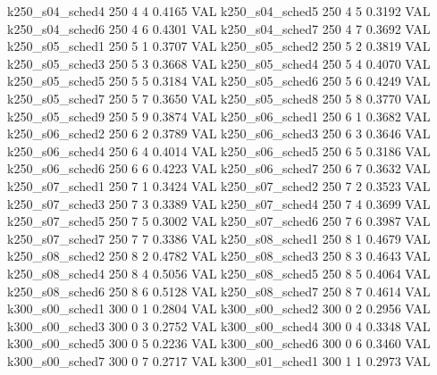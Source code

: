   k250_s04_sched4                  250    4   4    0.4165  VAL
  k250_s04_sched5                  250    4   5    0.3192  VAL
  k250_s04_sched6                  250    4   6    0.4301  VAL
  k250_s04_sched7                  250    4   7    0.3692  VAL
  k250_s05_sched1                  250    5   1    0.3707  VAL
  k250_s05_sched2                  250    5   2    0.3819  VAL
  k250_s05_sched3                  250    5   3    0.3668  VAL
  k250_s05_sched4                  250    5   4    0.4070  VAL
  k250_s05_sched5                  250    5   5    0.3184  VAL
  k250_s05_sched6                  250    5   6    0.4249  VAL
  k250_s05_sched7                  250    5   7    0.3650  VAL
  k250_s05_sched8                  250    5   8    0.3770  VAL
  k250_s05_sched9                  250    5   9    0.3874  VAL
  k250_s06_sched1                  250    6   1    0.3682  VAL
  k250_s06_sched2                  250    6   2    0.3789  VAL
  k250_s06_sched3                  250    6   3    0.3646  VAL
  k250_s06_sched4                  250    6   4    0.4014  VAL
  k250_s06_sched5                  250    6   5    0.3186  VAL
  k250_s06_sched6                  250    6   6    0.4223  VAL
  k250_s06_sched7                  250    6   7    0.3632  VAL
  k250_s07_sched1                  250    7   1    0.3424  VAL
  k250_s07_sched2                  250    7   2    0.3523  VAL
  k250_s07_sched3                  250    7   3    0.3389  VAL
  k250_s07_sched4                  250    7   4    0.3699  VAL
  k250_s07_sched5                  250    7   5    0.3002  VAL
  k250_s07_sched6                  250    7   6    0.3987  VAL
  k250_s07_sched7                  250    7   7    0.3386  VAL
  k250_s08_sched1                  250    8   1    0.4679  VAL
  k250_s08_sched2                  250    8   2    0.4782  VAL
  k250_s08_sched3                  250    8   3    0.4643  VAL
  k250_s08_sched4                  250    8   4    0.5056  VAL
  k250_s08_sched5                  250    8   5    0.4064  VAL
  k250_s08_sched6                  250    8   6    0.5128  VAL
  k250_s08_sched7                  250    8   7    0.4614  VAL
  k300_s00_sched1                  300    0   1    0.2804  VAL
  k300_s00_sched2                  300    0   2    0.2956  VAL
  k300_s00_sched3                  300    0   3    0.2752  VAL
  k300_s00_sched4                  300    0   4    0.3348  VAL
  k300_s00_sched5                  300    0   5    0.2236  VAL
  k300_s00_sched6                  300    0   6    0.3460  VAL
  k300_s00_sched7                  300    0   7    0.2717  VAL
  k300_s01_sched1                  300    1   1    0.2973  VAL
